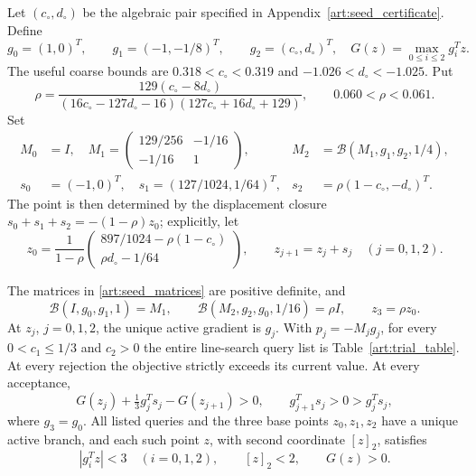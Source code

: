 Let $(c_\circ,d_\circ)$ be the algebraic pair specified in
Appendix~\ref{art:seed_certificate}. Define
\[
 g_0=(1,0)^T,\qquad g_1=(-1,-1/8)^T,\qquad g_2=(c_\circ,d_\circ)^T,
 \quad G(z)=\max_{0\le i\le2}g_i^Tz.
\]
The useful coarse bounds are $0.318<c_\circ<0.319$ and
$-1.026<d_\circ<-1.025$. Put
\begin{equation}\label{art:seed_rho}
 \rho=\frac{129(c_\circ-8d_\circ)}{(16c_\circ-127d_\circ-16)(127c_\circ+16d_\circ+129)},
 \qquad 0.060<\rho<0.061.
\end{equation}
Set
\begin{align}
 M_0&=I,\quad
 M_1=\begin{pmatrix}129/256&-1/16\\-1/16&1\end{pmatrix},
 &M_2&=\mathcal B(M_1,g_1,g_2,1/4),\label{art:seed_matrices}\\
 s_0&=(-1,0)^T,\quad s_1=(127/1024,1/64)^T,
 &s_2&=\rho(1-c_\circ,-d_\circ)^T.\label{art:seed_steps}
\end{align}
The point is then determined by the displacement closure
$s_0+s_1+s_2=-(1-\rho)z_0$; explicitly, let
\begin{equation}\label{art:seed_points}
 z_0=\frac1{1-\rho}
 \begin{pmatrix}897/1024-\rho(1-c_\circ)\\ \rho d_\circ-1/64\end{pmatrix},
 \qquad z_{j+1}=z_j+s_j\quad(j=0,1,2).
\end{equation}

\begin{lemma}\label{art:seed_cycle}
The matrices in \eqref{art:seed_matrices} are positive definite, and
\[
 \mathcal B(I,g_0,g_1,1)=M_1,\qquad
 \mathcal B(M_2,g_2,g_0,1/16)=\rho I,\qquad z_3=\rho z_0.
\]
At $z_j$, $j=0,1,2$, the unique active gradient is $g_j$.
With $p_j=-M_jg_j$, for every $0<c_1\le1/3$ and $c_2>0$ the entire
line-search query list is Table~\ref{art:trial_table}. At every rejection the objective strictly
exceeds its current value. At every acceptance,
\begin{equation}\label{art:seed_margins}
 G(z_j)+\tfrac13g_j^Ts_j-G(z_{j+1})>0,\qquad
 g_{j+1}^Ts_j>0>g_j^Ts_j,
\end{equation}
where $g_3=g_0$. All listed queries and the three base points $z_0,z_1,z_2$ have a
unique active branch, and each such point $z$, with second coordinate
$[z]_2$, satisfies
\begin{equation}\label{art:seed_query_bounds}
 |g_i^Tz|<3\quad(i=0,1,2),\qquad [z]_2<2,\qquad G(z)>0.
\end{equation}
\end{lemma}

